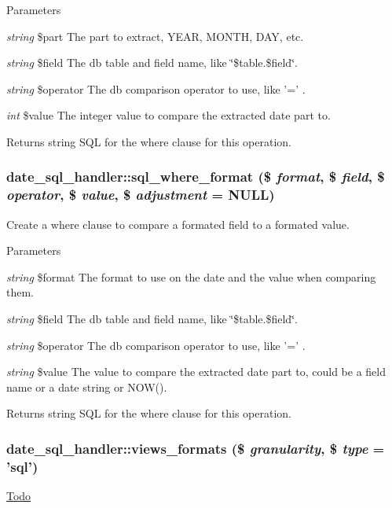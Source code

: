 \begin{DoxyParams}{Parameters}
\item[{\em string}]\$part The part to extract, YEAR, MONTH, DAY, etc. \item[{\em string}]\$field The db table and field name, like \char`\"{}\$table.\$field\char`\"{}. \item[{\em string}]\$operator The db comparison operator to use, like '=' . \item[{\em int}]\$value The integer value to compare the extracted date part to.\end{DoxyParams}
\begin{DoxyReturn}{Returns}
string SQL for the where clause for this operation. 
\end{DoxyReturn}
\hypertarget{classdate__sql__handler_a6eafe804210a031a0057e8ff84eca6a8}{
\subsubsection[{sql\_\-where\_\-format}]{\setlength{\rightskip}{0pt plus 5cm}date\_\-sql\_\-handler::sql\_\-where\_\-format (\$ {\em format}, \/  \$ {\em field}, \/  \$ {\em operator}, \/  \$ {\em value}, \/  \$ {\em adjustment} = {\ttfamily NULL})}}
\label{classdate__sql__handler_a6eafe804210a031a0057e8ff84eca6a8}
Create a where clause to compare a formated field to a formated value.


\begin{DoxyParams}{Parameters}
\item[{\em string}]\$format The format to use on the date and the value when comparing them. \item[{\em string}]\$field The db table and field name, like \char`\"{}\$table.\$field\char`\"{}. \item[{\em string}]\$operator The db comparison operator to use, like '=' . \item[{\em string}]\$value The value to compare the extracted date part to, could be a field name or a date string or NOW().\end{DoxyParams}
\begin{DoxyReturn}{Returns}
string SQL for the where clause for this operation. 
\end{DoxyReturn}
\hypertarget{classdate__sql__handler_a3a8cc9c8c0f40515901e8a7bf6299439}{
\subsubsection[{views\_\-formats}]{\setlength{\rightskip}{0pt plus 5cm}date\_\-sql\_\-handler::views\_\-formats (\$ {\em granularity}, \/  \$ {\em type} = {\ttfamily 'sql'})}}
\label{classdate__sql__handler_a3a8cc9c8c0f40515901e8a7bf6299439}
\begin{Desc}
\item[\hyperlink{todo__todo000051}{Todo}]\end{Desc}


